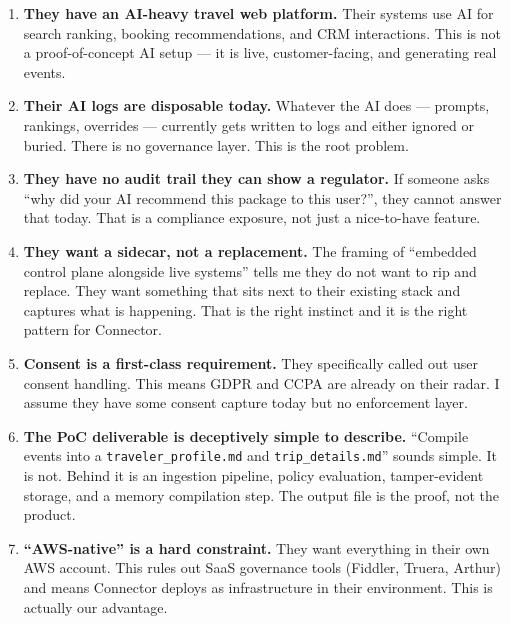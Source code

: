\documentclass[11pt, a4paper]{article}
\begin{document}
\begin{enumerate}[leftmargin=*, label=\textbf{\arabic*.}]

  \item \textbf{They have an AI-heavy travel web platform.}
  Their systems use AI for search ranking, booking recommendations, and CRM interactions.
  This is not a proof-of-concept AI setup --- it is live, customer-facing, and generating real events.

  \item \textbf{Their AI logs are disposable today.}
  Whatever the AI does --- prompts, rankings, overrides --- currently gets written to logs and
  either ignored or buried. There is no governance layer. This is the root problem.

  \item \textbf{They have no audit trail they can show a regulator.}
  If someone asks ``why did your AI recommend this package to this user?'', they cannot answer that
  today. That is a compliance exposure, not just a nice-to-have feature.

  \item \textbf{They want a sidecar, not a replacement.}
  The framing of ``embedded control plane alongside live systems'' tells me they do not want
  to rip and replace. They want something that sits next to their existing stack and captures
  what is happening. That is the right instinct and it is the right pattern for Connector.

  \item \textbf{Consent is a first-class requirement.}
  They specifically called out user consent handling. This means GDPR and CCPA are already
  on their radar. I assume they have some consent capture today but no enforcement layer.

  \item \textbf{The PoC deliverable is deceptively simple to describe.}
  ``Compile events into a \texttt{traveler\_profile.md} and \texttt{trip\_details.md}'' sounds
  simple. It is not. Behind it is an ingestion pipeline, policy evaluation, tamper-evident
  storage, and a memory compilation step. The output file is the proof, not the product.

  \item \textbf{``AWS-native'' is a hard constraint.}
  They want everything in their own AWS account. This rules out SaaS governance tools
  (Fiddler, Truera, Arthur) and means Connector deploys as infrastructure in their environment.
  This is actually our advantage.


\end{enumerate}
\end{document}
